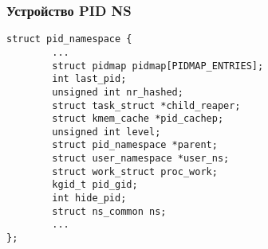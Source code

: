 \begin{frame}[fragile, label={pid_ns_inter}]
\frametitle{Устройство PID NS}
\begin{lstlisting}[basicstyle={\tiny\ttfamily}, title=\href{http://lxr.free-electrons.com/source/include/linux/pid_namespace.h\#L24}{pid\_namespace.h}]
struct pid_namespace {
        ...
        struct pidmap pidmap[PIDMAP_ENTRIES];
        int last_pid;
        unsigned int nr_hashed;
        struct task_struct *child_reaper;
        struct kmem_cache *pid_cachep;
        unsigned int level;
        struct pid_namespace *parent;
        struct user_namespace *user_ns;
        struct work_struct proc_work;
        kgid_t pid_gid;
        int hide_pid;
        struct ns_common ns;
        ...
};
\end{lstlisting}

\end{frame}


